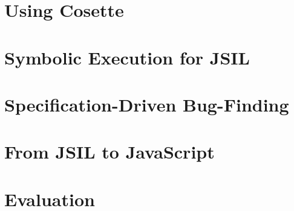 \documentclass[sigconf, anonymous, review]{acmart}
\newcommand{\jsil}{JSIL\xspace}
\newcommand{\polish}[1]{{\color{red}#1}}
\newcommand{\cosette}{Cosette\xspace}
\newcommand{\myparagraph}[1]{\smallskip\noindent {\bf #1.}\hspace{1pt}}
\begin{document}
%
%
%
%




\section{Using \cosette}\label{sec:overview}



\section{Symbolic Execution for \jsil}\label{sec:jsil:symb:exec}


\section{Specification-Driven Bug-Finding}\label{sec:specs}


\newpage
\section{From \jsil to JavaScript}\label{sec:lifting}


\newpage
\section{Evaluation}\label{sec:evaluation}


\newpage
\end{document}
